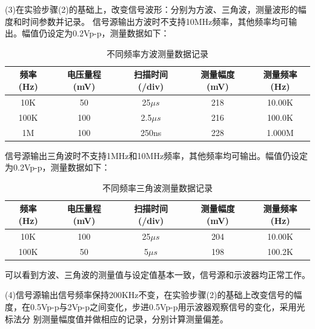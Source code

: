 \documentclass[12pt,a4paper]{article}
\begin{document}
(3)在实验步骤(2)的基础上，改变信号波形：分别为方波、三角波，测量波形的幅
度和时间参数并记录。
信号源输出方波时不支持10MHz频率，其他频率均可输出。幅值仍设定为0.2Vp-p，测量数据如下：
\begin{table}[H]
    \centering
    \begin{tabular}{|c|c|c|c|c|}
        \hline
        频率 (Hz) & 电压量程 (mV) & 扫描时间 (/div) & 测量幅度 (mV)  & 测量频率(Hz)  \\ \hline
        10K         & 50                 & 25$\mu s$     & 218     & 10.00K              \\ \hline
        100K        & 100                 & 2.5$\mu s$    & 216     & 100.0K              \\ \hline
        1M      & 100                 & 250ns         & 228     & 1.000M              \\ \hline
    \end{tabular}
    \caption{不同频率方波测量数据记录}
    \label{tab:square_wave_measurements}
\end{table}

信号源输出三角波时不支持1MHz和10MHz频率，其他频率均可输出。幅值仍设定为0.2Vp-p，测量数据如下：
\begin{table}[H]
    \centering
    \begin{tabular}{|c|c|c|c|c|}
        \hline
        频率 (Hz) & 电压量程 (mV) & 扫描时间 (/div) & 测量幅度 (mV)  & 测量频率(Hz)  \\ \hline
        10K         & 100                 & 25$\mu s$     & 204     & 10.00K              \\ \hline
        100K        & 50                 & 5$\mu s$    & 198     & 100.2K              \\ \hline
    \end{tabular}
    \caption{不同频率三角波测量数据记录}
    \label{tab:triangle_wave_measurements}
\end{table}
可以看到方波、三角波的测量值与设定值基本一致，信号源和示波器均正常工作。

(4)信号源输出信号频率保持200KHz不变，在实验步骤(2)的基础上改变信号的幅
度，在0.5Vp-p与2Vp-p之间变化，步进0.5Vp-p用示波器观察信号的变化，采用光标法分
别测量幅度值并做相应的记录，分别计算测量偏差。
\end{document}
